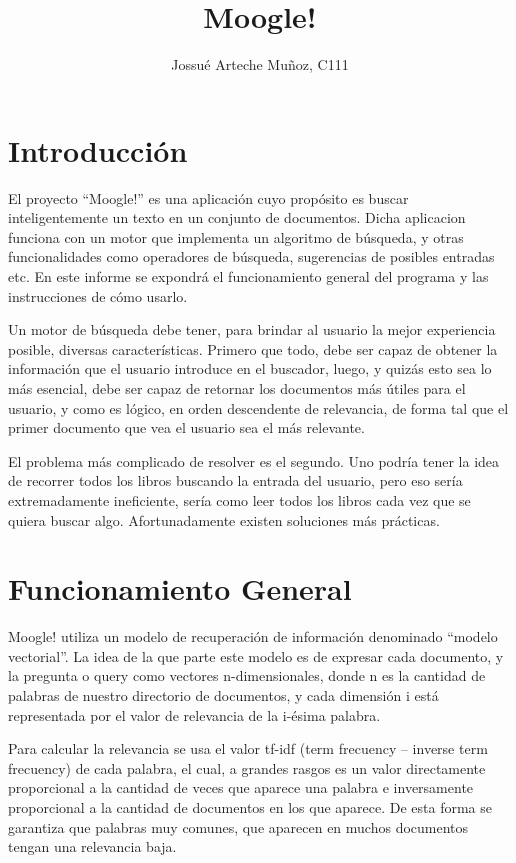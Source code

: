 \documentclass[a4paper, 12pt]{article}
\begin{document}
\title{Moogle!}
\author{Jossué Arteche Muñoz, C111}
\maketitle

\section{Introducción}
El proyecto “Moogle!” es una aplicación cuyo propósito es buscar inteligentemente un texto en un conjunto de documentos. Dicha aplicacion funciona con un motor que implementa un algoritmo de búsqueda, y otras funcionalidades como operadores de búsqueda, sugerencias de posibles entradas etc. En este informe se expondrá el funcionamiento general del programa y las instrucciones de cómo usarlo.

Un motor de búsqueda debe tener, para brindar al usuario la mejor experiencia posible, diversas características. Primero que todo, debe ser capaz de obtener la información que el usuario introduce en el buscador, luego, y quizás esto sea lo más esencial, debe ser capaz de retornar los documentos más útiles para el usuario, y como es lógico, en orden descendente de relevancia, de forma tal que el primer documento que vea el usuario sea el más relevante.

El problema más complicado de resolver es el segundo. Uno podría tener la idea de recorrer todos los libros buscando la entrada del usuario, pero eso sería extremadamente ineficiente, sería como leer todos los libros cada vez que se quiera buscar algo. Afortunadamente existen soluciones más prácticas.

\section{Funcionamiento General}
Moogle! utiliza un modelo de recuperación de información denominado “modelo vectorial”. La idea de la que parte este modelo es de expresar cada documento, y la pregunta o query como vectores n-dimensionales, donde n es la cantidad de palabras de nuestro directorio de documentos, y cada dimensión i está representada por el valor de relevancia de la i-ésima palabra.

Para calcular la relevancia se usa el valor tf-idf (term frecuency – inverse term frecuency) de cada palabra, el cual, a grandes rasgos es un valor directamente proporcional a la cantidad de veces que aparece una palabra e inversamente proporcional a la cantidad de documentos en los que aparece. De esta forma se garantiza que palabras muy comunes, que aparecen en muchos documentos tengan una relevancia baja.
\end{document}
